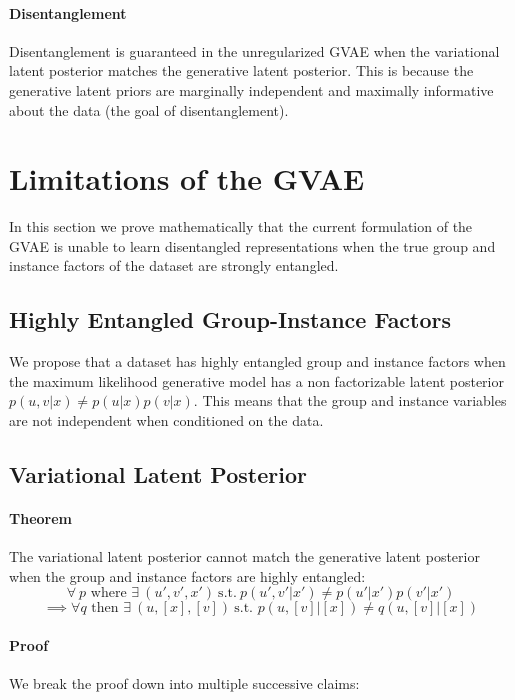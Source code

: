 \documentclass{article}
\begin{document}
\paragraph{Disentanglement} Disentanglement is guaranteed in the unregularized GVAE when the variational latent posterior matches the generative latent posterior. This is because the generative latent priors are marginally independent and maximally informative about the data (the goal of disentanglement).

\section{Limitations of the GVAE}

In this section we prove mathematically that the current formulation of the GVAE is unable to learn disentangled representations when the true group and instance factors of the dataset are strongly entangled.

\subsection{Highly Entangled Group-Instance Factors}

We propose that a dataset has highly entangled group and instance factors when the maximum likelihood generative model has a non factorizable latent posterior $p(u, v | x) \neq p(u | x) p(v | x)$. This means that the group and instance variables are not independent when conditioned on the data.

\subsection{Variational Latent Posterior}

\paragraph{Theorem} The variational latent posterior cannot match the generative latent posterior when the group and instance factors are highly entangled: $$\forall ~ p \textrm{ where } \exists ~ (u', v', x') ~\textrm {s.t.}~ p(u', v' | x') \neq p(u' | x') p(v' | x')$$ $$\implies \forall q \textrm{ then } \exists ~ (u, [x], [v]) ~ \textrm{s.t. } p(u, [v] | [x]) \neq q(u, [v] | [x])$$

\paragraph{Proof} We break the proof down into multiple successive claims:
\end{document}
